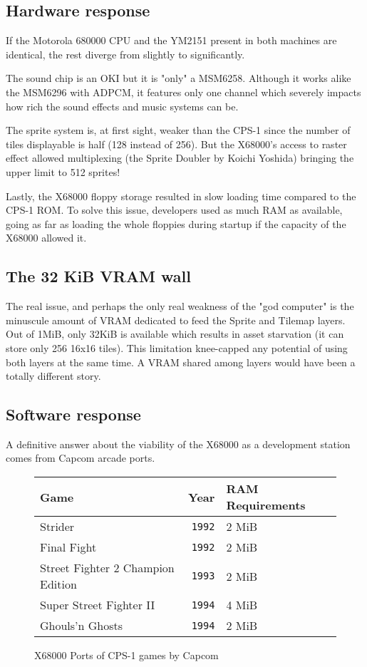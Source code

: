 \subsection{Hardware response}
If the Motorola 680000 CPU and the YM2151 present in both machines are identical, the rest diverge from slightly to significantly.

The sound chip is an OKI but it is "only" a MSM6258. Although it works alike the MSM6296 with ADPCM, it features only one channel which severely impacts how rich the sound effects and music systems can be.

The sprite system is, at first sight, weaker than the CPS-1 since the number of tiles displayable is half (128 instead of 256). But the X68000's  access to raster effect allowed multiplexing (the Sprite Doubler by Koichi Yoshida\cite{x68000spritedoubler}) bringing the upper limit to 512 sprites!

Lastly, the X68000 floppy storage resulted in slow loading time compared to the CPS-1 ROM. To solve this issue, developers used as much RAM as available, going as far as loading the whole floppies during startup if the capacity of the X68000 allowed it.



\subsection{The 32 KiB VRAM wall}

The real issue, and perhaps the only real weakness of the "god computer" is the minuscule amount of VRAM dedicated to feed the Sprite and Tilemap layers. Out of 1MiB, only 32KiB is available which results in asset starvation (it can store only  256 16x16 tiles). This limitation knee-capped any potential of using both layers at the same time. A VRAM shared among layers would have been a totally different story.

\subsection{Software response}

A definitive answer about the viability of the X68000 as a development station comes from Capcom arcade ports.
\begin{figure}[H]
\label{x68000-specs}
\begin{tabularx}{\textwidth}{lrY}
  \toprule    
  \textbf{Game } & \textbf{Year}  & \textbf{RAM Requirements } \\               
  \toprule   
  Strider & \texttt{1992} &  2 MiB \\
  Final Fight & \texttt{1992} &  2 MiB \\
  Street Fighter 2 Champion Edition & \texttt{1993} &  2 MiB \\
  Super Street Fighter II & \texttt{1994} &  4 MiB \\
  Ghouls'n Ghosts & \texttt{1994} &  2 MiB \\
    \toprule   
\end{tabularx}
\caption*{X68000 Ports of CPS-1 games by Capcom}
\end{figure}

